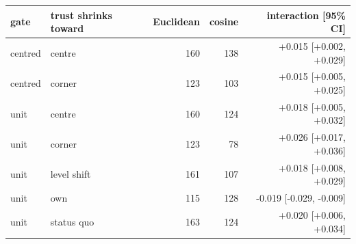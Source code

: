 \begin{tabular}{llrrr}
\toprule
gate & trust shrinks toward & Euclidean & cosine & interaction [95\% CI] \\
\midrule
centred & centre & 160 & 138 & +0.015 [+0.002, +0.029] \\
centred & corner & 123 & 103 & +0.015 [+0.005, +0.025] \\
unit & centre & 160 & 124 & +0.018 [+0.005, +0.032] \\
unit & corner & 123 & 78 & +0.026 [+0.017, +0.036] \\
unit & level shift & 161 & 107 & +0.018 [+0.008, +0.029] \\
unit & own & 115 & 128 & -0.019 [-0.029, -0.009] \\
unit & status quo & 163 & 124 & +0.020 [+0.006, +0.034] \\
\bottomrule
\end{tabular}
